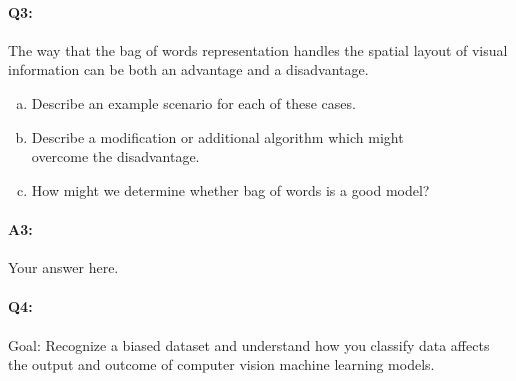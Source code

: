 






\pagebreak
\paragraph{Q3:} The way that the bag of words representation handles the spatial layout of visual information can be both an advantage and a disadvantage.
\begin{enumerate}[(a)]
\item Describe an example scenario for each of these cases.
\item Describe a modification or additional algorithm which might\\overcome the disadvantage.

\item How might we determine whether bag of words is a good model?
\end{enumerate}
\paragraph{A3:} Your answer here.










\pagebreak
\paragraph{Q4:} Goal: Recognize a biased dataset and understand how you classify data affects the output and outcome of computer vision machine learning models.

